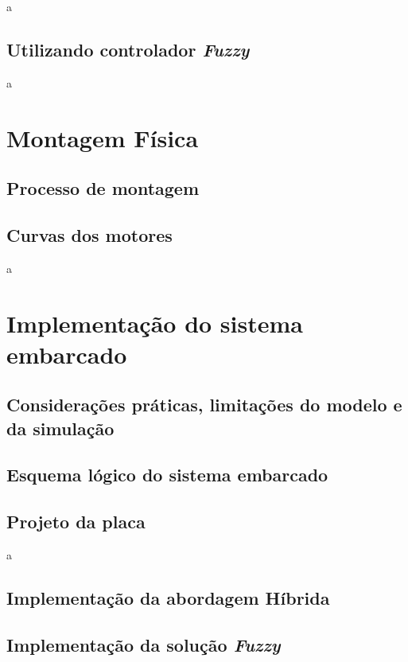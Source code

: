	a
	
	\subsection{Utilizando controlador \textit{Fuzzy}}
	
	a
	
\section{Montagem Física}

	\subsection{Processo de montagem}

	\subsection{Curvas dos motores}

a
	
\section{Implementação do sistema embarcado}

	\subsection{Considerações práticas, limitações do modelo e da simulação}

	\subsection{Esquema lógico do sistema embarcado}

	\subsection{Projeto da placa}
	
	a
	
	\subsection{Implementação da abordagem Híbrida}

	\subsection{Implementação da solução \textit{Fuzzy}}
	
